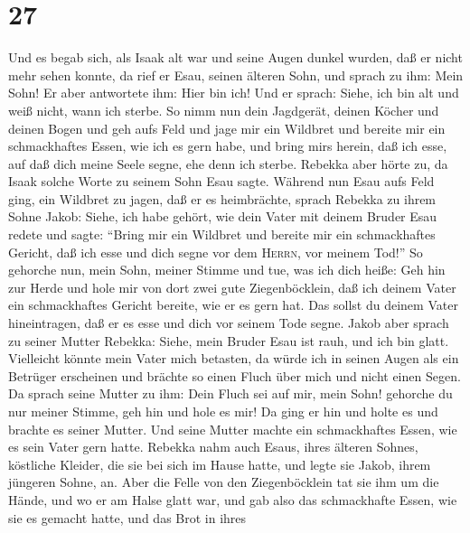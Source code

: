 \hypertarget{section-26}{%
\section{27}\label{section-26}}

 Und es begab sich, als Isaak alt war und seine Augen
dunkel wurden, daß er nicht mehr sehen konnte, da rief er Esau, seinen
älteren Sohn, und sprach zu ihm: Mein Sohn! Er aber antwortete ihm: Hier
bin ich!  Und er sprach: Siehe, ich bin alt und weiß
nicht, wann ich sterbe.  So nimm nun dein Jagdgerät,
deinen Köcher und deinen Bogen und geh aufs Feld und jage mir ein
Wildbret  und bereite mir ein schmackhaftes Essen, wie ich
es gern habe, und bring mir\textquotesingle s herein, daß ich esse, auf
daß dich meine Seele segne, ehe denn ich sterbe.  Rebekka
aber hörte zu, da Isaak solche Worte zu seinem Sohn Esau sagte.
 Während nun Esau aufs Feld ging, ein Wildbret zu jagen,
daß er es heimbrächte,  sprach Rebekka zu ihrem Sohne
Jakob: Siehe, ich habe gehört, wie dein Vater mit deinem Bruder Esau
redete und sagte: ``Bring mir ein Wildbret und bereite mir ein
schmackhaftes Gericht, daß ich esse und dich segne vor dem
\textsc{Herrn}, vor meinem Tod!''  So gehorche nun, mein
Sohn, meiner Stimme und tue, was ich dich heiße:  Geh hin
zur Herde und hole mir von dort zwei gute Ziegenböcklein, daß ich deinem
Vater ein schmackhaftes Gericht bereite, wie er es gern hat.
 Das sollst du deinem Vater hineintragen, daß er es esse
und dich vor seinem Tode segne.  Jakob aber sprach zu
seiner Mutter Rebekka: Siehe, mein Bruder Esau ist rauh, und ich bin
glatt.  Vielleicht könnte mein Vater mich betasten, da
würde ich in seinen Augen als ein Betrüger erscheinen und brächte so
einen Fluch über mich und nicht einen Segen.  Da sprach
seine Mutter zu ihm: Dein Fluch sei auf mir, mein Sohn! gehorche du nur
meiner Stimme, geh hin und hole es mir!  Da ging er hin
und holte es und brachte es seiner Mutter. Und seine Mutter machte ein
schmackhaftes Essen, wie es sein Vater gern hatte. 
Rebekka nahm auch Esaus, ihres älteren Sohnes, köstliche Kleider, die
sie bei sich im Hause hatte, und legte sie Jakob, ihrem jüngeren Sohne,
an.  Aber die Felle von den Ziegenböcklein tat sie ihm um
die Hände, und wo er am Halse glatt war,  und gab also
das schmackhafte Essen, wie sie es gemacht hatte, und das Brot in ihres
